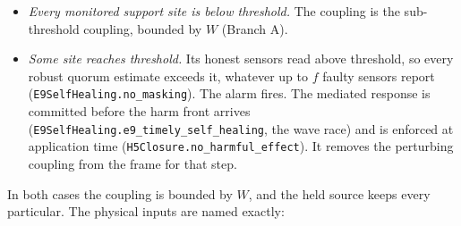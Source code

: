 \documentclass[
]{article}
\providecommand{\tightlist}{%
  \setlength{\itemsep}{0pt}\setlength{\parskip}{0pt}}
\begin{document}
\begin{itemize}
\tightlist
\item
  \emph{Every monitored support site is below threshold.} The coupling
  is the sub-threshold coupling, bounded by \(W\) (Branch A).
\item
  \emph{Some site reaches threshold.} Its honest sensors read above
  threshold, so every robust quorum estimate exceeds it, whatever up to
  \(f\) faulty sensors report
  (\texttt{E\allowbreak{}9\allowbreak{}S\allowbreak{}e\allowbreak{}l\allowbreak{}f\allowbreak{}H\allowbreak{}e\allowbreak{}a\allowbreak{}l\allowbreak{}i\allowbreak{}n\allowbreak{}g\allowbreak{}.\allowbreak{}n\allowbreak{}o\allowbreak{}\_\allowbreak{}m\allowbreak{}a\allowbreak{}s\allowbreak{}k\allowbreak{}i\allowbreak{}n\allowbreak{}g}).
  The alarm fires. The mediated response is committed before the harm
  front arrives
  (\texttt{E\allowbreak{}9\allowbreak{}S\allowbreak{}e\allowbreak{}l\allowbreak{}f\allowbreak{}H\allowbreak{}e\allowbreak{}a\allowbreak{}l\allowbreak{}i\allowbreak{}n\allowbreak{}g\allowbreak{}.\allowbreak{}e\allowbreak{}9\allowbreak{}\_\allowbreak{}t\allowbreak{}i\allowbreak{}m\allowbreak{}e\allowbreak{}l\allowbreak{}y\allowbreak{}\_\allowbreak{}s\allowbreak{}e\allowbreak{}l\allowbreak{}f\allowbreak{}\_\allowbreak{}h\allowbreak{}e\allowbreak{}a\allowbreak{}l\allowbreak{}i\allowbreak{}n\allowbreak{}g},
  the wave race) and is enforced at application time
  (\texttt{H\allowbreak{}5\allowbreak{}C\allowbreak{}l\allowbreak{}o\allowbreak{}s\allowbreak{}u\allowbreak{}r\allowbreak{}e\allowbreak{}.\allowbreak{}n\allowbreak{}o\allowbreak{}\_\allowbreak{}h\allowbreak{}a\allowbreak{}r\allowbreak{}m\allowbreak{}f\allowbreak{}u\allowbreak{}l\allowbreak{}\_\allowbreak{}e\allowbreak{}f\allowbreak{}f\allowbreak{}e\allowbreak{}c\allowbreak{}t}).
  It removes the perturbing coupling from the frame for that step.
\end{itemize}

In both cases the coupling is bounded by \(W\), and the held source
keeps every particular. The physical inputs are named exactly:
\end{document}
